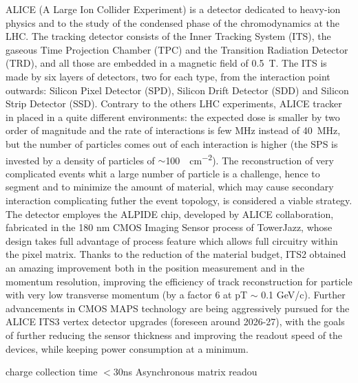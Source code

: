         ALICE (A Large Ion Collider Experiment) is a detector dedicated to heavy-ion physics and to the study of the condensed phase of the chromodynamics at the LHC.
        The tracking detector consists of the Inner Tracking System (ITS), the gaseous Time Projection Chamber (TPC) and the Transition Radiation Detector (TRD),  and all those are embedded in a magnetic field of \SI{0.5}{T}. The ITS is made by six layers of detectors, two for each type, from the interaction point outwards: Silicon Pixel Detector (SPD), Silicon Drift Detector (SDD) and Silicon Strip Detector (SSD).         
        Contrary to the others LHC experiments, ALICE tracker in placed in a quite different environments: the expected dose is smaller by two order of magnitude and the rate of interactions is few \si{MHz} instead of \SI{40}{MHz}, but the number of particles comes out of each interaction is higher (the SPS is invested by a density of particles of $\sim$\SI{100}{\per cm\tothe{-2}}).  
        The reconstruction of very complicated events whit a large number of particle is a challenge, hence to segment and to minimize the amount of material, which may cause secondary interaction complicating futher the event topology, is considered a viable strategy. 
        The detector employes the ALPIDE chip, developed by ALICE collaboration, fabricated in the 180 nm CMOS Imaging Sensor process of TowerJazz, whose design takes full advantage of process feature which allows full circuitry within the pixel matrix.
        Thanks to the reduction of the material budget, ITS2 obtained an amazing improvement both in the position measurement and in the momentum resolution, improving the efficiency of track reconstruction for particle with very low transverse momentum (by a factor 6 at pT $\sim$ 0.1 GeV/c). Further advancements in CMOS MAPS technology are being aggressively pursued for the ALICE ITS3 vertex detector upgrades (foreseen around 2026-27), with the goals of further reducing the sensor thickness and improving the readout speed of the devices, while keeping power consumption at a minimum.


        charge collection time $<$30ns        Asynchronous
        matrix readou

